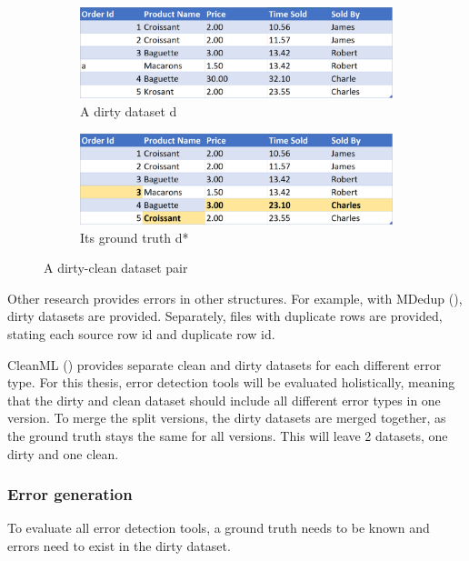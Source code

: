 \begin{figure}[h]
\centering
\begin{subfigure}[b]{0.75\textwidth}
   \includegraphics[width=\linewidth]{thesis/Figures/DirtyDataset.png}
   \caption{A dirty dataset d}
   \label{fig:dirtydataset} 
\end{subfigure}

\begin{subfigure}[b]{0.75\textwidth}
   \includegraphics[width=\linewidth]{thesis/Figures/CleanDataset.png}
   \caption{Its ground truth d*}
   \label{fig:cleandataset}
\end{subfigure}
\caption{A dirty-clean dataset pair}
\end{figure}

Other research provides errors in other structures. For example, with MDedup (\cite{Koumarelas2020-oz}), dirty datasets are provided. Separately, files with duplicate rows are provided, stating each source row id and duplicate row id. 

CleanML (\cite{Li2019-ve}) provides separate clean and dirty datasets for each different error type. For this thesis, error detection tools will be evaluated holistically, meaning that the dirty and clean dataset should include all different error types in one version. To merge the split versions, the dirty datasets are merged together, as the ground truth stays the same for all versions. This will leave 2 datasets, one dirty and one clean.


\subsubsection{Error generation}
To evaluate all error detection tools, a ground truth needs to be known and errors need to exist in the dirty dataset. 

